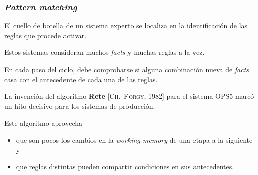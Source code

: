 \documentclass{beamer}    %
\begin{document}
\begin{frame}
 \frametitle{\emph{Pattern matching}}

 El \underline{cuello de botella} de un sistema experto se
 localiza en la identificación de las reglas que procede
 activar.
 \vspace{3mm}

 Estos sistemas consideran muchos \emph{facts} y muchas
 reglas a la vez.
 \vspace{3mm}

 En cada paso del ciclo, debe comprobarse
 si alguna combinación nueva de \emph{facts} casa con el
 antecedente de cada una de las reglas.
 \vspace{5mm}

 \pause

 La invención del algoritmo {\color{naranja_muy} \bf Rete}
 [\textsc{Ch. Forgy}, 1982] para el sistema OPS5 marcó un
 hito decisivo para los sistemas de producción.
 \vspace{3mm}

 Este algoritmo aprovecha
 \begin{itemize}
 \item
 que son pocos los cambios en la \emph{working memory} de
 una etapa a la siguiente y
 \vspace{3mm}

 \item
 que reglas distintas pueden compartir condiciones en sus antecedentes.
 \end{itemize}
\end{frame}
\end{document}
